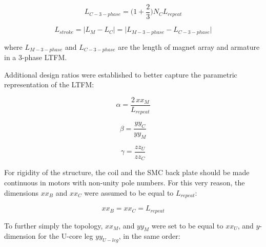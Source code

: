         
        \begin{equation}
            L_{C-3-phase} = \bigg(1+\frac{2}{3}\bigg) N_C L_{repeat} 
            \label{eq:chap/rsm/LTFM/L_C_3phase}
        \end{equation}
        
        
        \begin{equation}
            L_{stroke} = \big| L_M-L_C \big| = \big| L_{M-3-phase} - L_{C-3-phase} \big|
            \label{eq:chap/rsm/LTFM/L_stroke}
        \end{equation}
        
        
        where $L_{M-3-phase}$ and $L_{C-3-phase}$ are the length of magnet array and armature in a 3-phase \acs{LTFM}.

        
        
        Additional design ratios were established to better capture the parametric representation of the \acs{LTFM}:
        
        
        \begin{equation}
            \alpha=\frac{2\,xx_M}{L_{repeat}}
            \label{eq:chap/rsm/LTFM/alpha}
        \end{equation}
        
        
        \begin{equation}
            \beta=\frac{yy_C}{yy_M}
            \label{eq:chap/rsm/LTFM/beta}
        \end{equation}
        
        
        \begin{equation}
            \gamma=\frac{zz_U}{zz_C}
            \label{eq:chap/rsm/LTFM/gamma}
        \end{equation}
        
        
        For rigidity of the structure, the coil and the SMC back plate should be made continuous in motors with non-unity pole numbers. For this very reason, the dimensions $xx_B$ and $xx_C$ were assumed to be equal to $L_{repeat}$:
        
        
        \begin{equation}
            xx_B = xx_C = L_{repeat}
            \label{eq:chap/rsm/LTFM/xb is xc is lrepeat}
        \end{equation}
        
        
        To further simply the topology, $xx_M$, and $yy_M$ were set to be equal to $xx_U$, and $y$-dimension for the U-core leg $yy_{U-leg}$, in the same order:
        
